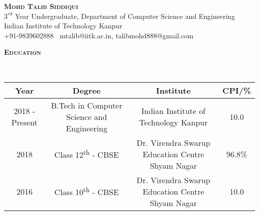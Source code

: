 \documentclass[9pt]{article}
\newenvironment{changemargin}[2]{%
  \begin{list}{}{%
    \setlength{\topsep}{2pt}%
    \setlength{\leftmargin}{#1}%
    \setlength{\rightmargin}{#2}%
    \setlength{\listparindent}{\parindent}%
    \setlength{\itemindent}{\parindent}%
    \setlength{\parsep}{\parskip}%
  }%
  \item[]}{\end{list}
}
\newcommand{\lineover}{
	\begin{changemargin}{0in}{0in}
		\vspace*{-18pt}
		\hrulefill \\
		\vspace*{-8pt}
	\end{changemargin}
}
\newcommand{\header}[1]{
	\begin{changemargin}{-0.5in}{-0.5in}
	\vspace{-4pt}
		\Large\bfseries\scshape{#1}\hrulefill
  	\lineover
	\end{changemargin}
}
\newcommand{\contact}[4]{
	\begin{changemargin}{-0.0in}{-0.0in}
		\begin{center}
			{\Huge \scshape\bfseries{#1}}\\ \smallskip
			{#2}\vspace{-2pt}\\ \smallskip 
			{#3}
			{#4}
		\end{center}
	\end{changemargin}
}
\newenvironment{body} {
	\vspace*{-16pt}
	\begin{changemargin}{-0.4in}{-0.5in}
  }	
	{\end{changemargin}
}
\begin{document}
\setlength{\topmargin}{-0.8in}
\contact{Mohd Talib Siddiqui}{$3^{rd}$ Year Undergraduate, Department of Computer Science and Engineering}
{Indian Institute of Technology Kanpur\\}{\Mobilefone +91-9839602888 $\;$\Letter$\;$mtalib@iitk.ac.in, talibmohd888@gmail.com}

\smallskip


\vspace*{-4pt}
\vspace*{-4pt}
\header{Education}


\begin{body}
\vspace{8pt}
\renewcommand{\arraystretch}{1.1}
    \begin{tabular}{|c|c|c|c|}
    \hline
        \textbf{Year} & \textbf{Degree} & \textbf{Institute} & \textbf{CPI/\%}\\
    \hline
        2018 - Present & B.Tech in Computer Science and Engineering & Indian Institute of Technology Kanpur & 10.0 \\
    \hline
        2018 & Class 12\textsuperscript{th} - CBSE & Dr. Virendra Swarup Education Centre Shyam Nagar & 96.8\%\\
    \hline
        2016 & Class 10\textsuperscript{th} - CBSE & Dr. Virendra Swarup Education Centre Shyam Nagar & 10.0\\
    \hline
    \end{tabular}
\end{body}
\end{document}
